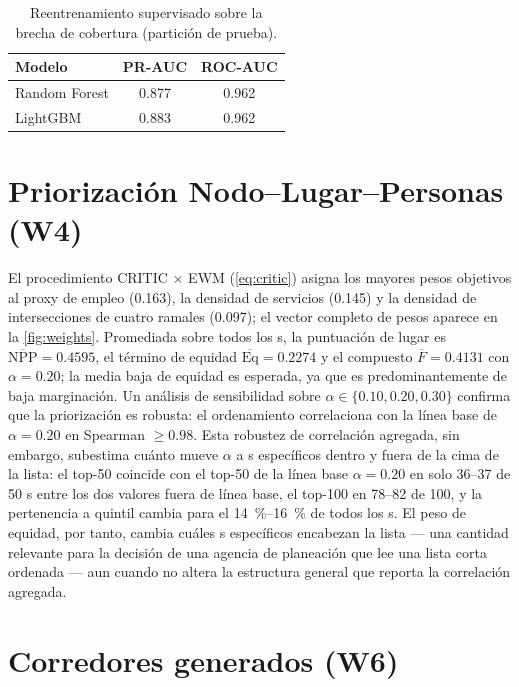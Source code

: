 \begin{table}[htbp]
\centering
\caption{Reentrenamiento supervisado sobre la brecha de cobertura (partición de prueba).}
\label{tab:retrain}
\begin{tabular}{lS[table-format=1.3]S[table-format=1.3]}
\toprule
Modelo & {PR-AUC} & {ROC-AUC} \\
\midrule
Random Forest & 0.877 & 0.962 \\
LightGBM      & 0.883 & 0.962 \\
\bottomrule
\end{tabular}
\end{table}

\section{Priorización Nodo--Lugar--Personas (W4)}
\label{sec:res-w4}

El procedimiento CRITIC$\,\times\,$EWM (\cref{eq:critic}) asigna los mayores pesos
objetivos al proxy de empleo (\num{0.163}), la densidad de servicios (\num{0.145}) y
la densidad de intersecciones de cuatro ramales (\num{0.097}); el vector completo de
pesos aparece en la \cref{fig:weights}. Promediada sobre todos los \ageb{}s, la
puntuación de lugar es $\overline{\mathrm{NPP}} = \num{0.4595}$, el término de
equidad $\overline{\mathrm{Eq}} = \num{0.2274}$ y el compuesto
$\overline{F} = \num{0.4131}$ con $\alpha = \num{0.20}$; la media baja de equidad es
esperada, ya que \zmg es predominantemente de baja marginación. Un análisis de
sensibilidad sobre $\alpha \in \{0.10, 0.20, 0.30\}$ confirma que la priorización es
robusta: el ordenamiento correlaciona con la línea base de $\alpha = \num{0.20}$ en
Spearman $\ge \num{0.98}$. Esta robustez de correlación agregada, sin embargo,
subestima cuánto mueve $\alpha$ a \ageb{}s específicos dentro y fuera de la cima de la
lista: el top-50 coincide con el top-50 de la línea base $\alpha=0.20$ en solo
\num{36}--\num{37} de \num{50} \ageb{}s entre los dos valores fuera de línea base, el
top-100 en \num{78}--\num{82} de \num{100}, y la pertenencia a quintil cambia para el
\SI{14}{\percent}--\SI{16}{\percent} de todos los \ageb{}s. El peso de equidad, por
tanto, cambia cuáles \ageb{}s específicos encabezan la lista --- una cantidad relevante
para la decisión de una agencia de planeación que lee una lista corta ordenada --- aun
cuando no altera la estructura general que reporta la correlación agregada.

\section{Corredores generados (W6)}
\label{sec:res-w6}

